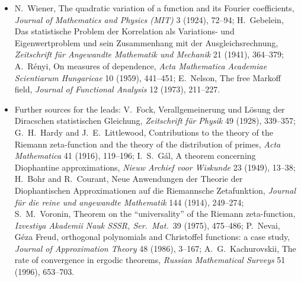 \begin{itemize}
\item N.~Wiener, The quadratic variation of a function and its Fourier coefficients, \emph{Journal of Mathematics and Physics (MIT)} 3 (1924), 72--94; H.~Gebelein, Das statistische
Problem der Korrelation als Variations- und Eigenwertproblem und sein Zusammenhang mit der Ausgleichsrechnung, \emph{Zeitschrift für Angewandte Mathematik und Mechanik} 21 (1941),
364--379; A.~Rényi, On measures of dependence, \emph{Acta Mathematica Academiae Scientiarum Hungaricae} 10 (1959), 441--451; E.~Nelson, The free Markoff field, \emph{Journal of
Functional Analysis} 12 (1973), 211--227.
\item Further sources for the leads: V.~Fock, Verallgemeinerung und Lösung der Diracschen statistischen Gleichung, \emph{Zeitschrift für Physik} 49 (1928), 339--357; G.~H.~Hardy and
J.~E.~Littlewood, Contributions to the theory of the Riemann zeta-function and the theory of the distribution of primes, \emph{Acta Mathematica} 41 (1916), 119--196; I.~S.~Gál, A theorem
concerning Diophantine approximations, \emph{Nieuw Archief voor Wiskunde} 23 (1949), 13--38; H.~Bohr and R.~Courant, Neue Anwendungen der Theorie der Diophantischen Approximationen auf
die Riemannsche Zetafunktion, \emph{Journal für die reine und angewandte Mathematik} 144 (1914), 249--274; S.~M.~Voronin, Theorem on the ``universality'' of the Riemann zeta-function,
\emph{Izvestiya Akademii Nauk SSSR, Ser.\ Mat.}\ 39 (1975), 475--486; P.~Nevai, Géza Freud, orthogonal polynomials and Christoffel functions: a case study, \emph{Journal of Approximation
Theory} 48 (1986), 3--167; A.~G.~Kachurovskii, The rate of convergence in ergodic theorems, \emph{Russian Mathematical Surveys} 51 (1996), 653--703.
\end{itemize}
